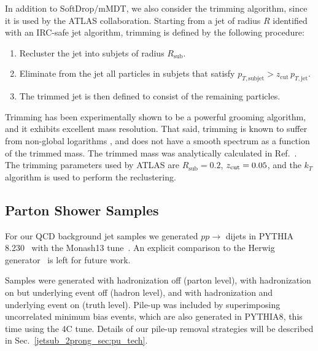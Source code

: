 \documentclass[11pt]{cernrep}
\begin{document}
In addition to SoftDrop/mMDT, we also consider the trimming algorithm, since it is used by the ATLAS collaboration.
%
Starting from a jet of radius $R$ identified with an IRC-safe jet algorithm, trimming is defined by the following procedure:
%
\begin{enumerate}
%
\item Recluster the jet into subjets of radius $R_{\text{sub}}$.
%
\item Eliminate from the jet all particles in subjets that satisfy
  $p_{T,\text{subjet}} > z_{\text{cut}} \, p_{T,\text{jet}}$.
%
\item The trimmed jet is then defined to consist of the remaining particles.
%
\end{enumerate}
%
Trimming has been experimentally shown to be a powerful grooming algorithm, and it exhibits excellent mass resolution.
%
That said, trimming is known to suffer from non-global logarithms \cite{Dasgupta:2001sh}, and does not have a smooth spectrum as a function of the trimmed mass.
%
The trimmed mass was analytically calculated in Ref.~\cite{Dasgupta:2013ihk}.
%
The trimming parameters used by ATLAS are $R_{\text{sub}}=0.2$,  $ {z_{\rm cut}}=0.05$, and the $k_T$ algorithm is used to perform the reclustering.


\subsection{Parton Shower Samples}\label{jetsub_2prong_sec:samples_sub}



For our QCD background jet samples we generated $pp\to$ dijets in
\textsc{PYTHIA} 8.230~\cite{Sjostrand:2006za,Sjostrand:2007gs} with
the Monash13 tune~\cite{Skands:2014pea}. 
%
An explicit comparison to the Herwig
generator~\cite{Bahr:2008pv,Bellm:2015jjp} is left for future work.

%
Samples were generated with hadronization off (parton level), with
hadronization on but underlying event off (hadron level), and with
hadronization and underlying event on (truth level). Pile-up was
included by superimposing uncorrelated minimum bias events, which are
also generated in \textsc{PYTHIA8}, this time using the 4C
tune. Details of our pile-up removal strategies will be described in
Sec.~\ref{jetsub_2prong_sec:pu_tech}.
\end{document}
